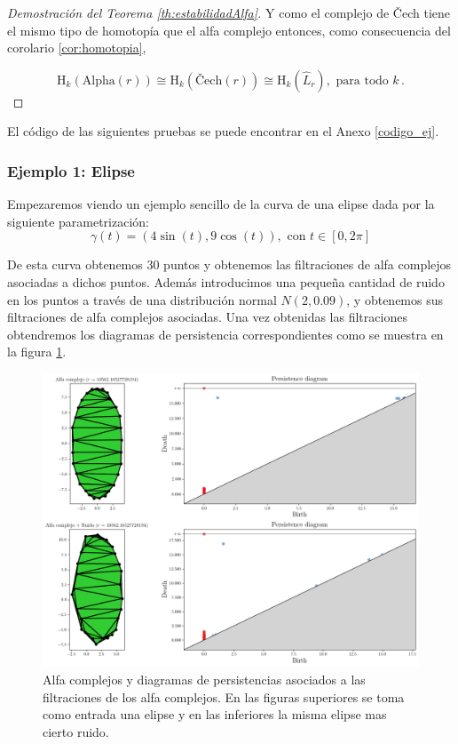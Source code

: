 \begin{proof}[Demostración del Teorema \ref{th:estabilidadAlfa}]
Y como el complejo de \v{C}ech tiene el mismo tipo de homotopía que el alfa complejo entonces, como consecuencia del corolario \ref{cor:homotopia},

\[
\text{H}_k(\text{Alpha}(r)) \cong \text{H}_k(\text{\v{C}ech}(r)) \cong \text{H}_k(\widehat{L}_r), \text{ para todo } k\,.
\]
\end{proof}

El código de las siguientes pruebas se puede encontrar en el Anexo \ref{codigo_ej}.

\subsubsection{Ejemplo 1: Elipse}
Empezaremos viendo un ejemplo sencillo de la curva de una elipse dada por la siguiente parametrización:
\[
\gamma(t)= (4\sin(t), 9\cos(t)), \text{ con } t\in [0,2\pi]
\]

De esta curva obtenemos 30 puntos y obtenemos las filtraciones de alfa complejos asociadas a dichos puntos. Además introducimos una pequeña cantidad de ruido en los puntos a través de una distribución normal $N(2, 0.09)$, y obtenemos sus filtraciones de alfa complejos asociadas. Una vez obtenidas las filtraciones obtendremos los diagramas de persistencia correspondientes como se muestra en la figura \ref{ref:persEj1}.

\begin{figure}[!ht]
\centering
\includegraphics[width=\textwidth]{../code/output/ejemplo1.png} 
\caption{Alfa complejos y diagramas de persistencias asociados a las filtraciones de los alfa complejos. En las figuras superiores se toma como entrada una elipse y en las inferiores la misma elipse mas cierto ruido.}
\label{ref:persEj1}
\end{figure} 

